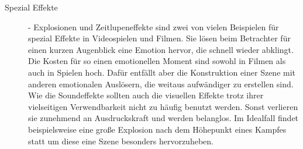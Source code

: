 \begin{description}
%
%
%
%
%
\item[Spezial Effekte] - Explosionen und Zeitlupeneffekte sind zwei von vielen Beispielen für spezial Effekte in Videospielen und Filmen. Sie lösen beim Betrachter für einen kurzen Augenblick eine Emotion hervor, die schnell wieder abklingt. Die Kosten für so einen emotionellen Moment sind sowohl in Filmen als auch in Spielen hoch. Dafür entfällt aber die Konstruktion einer Szene mit anderen emotionalen Auslösern, die weitaus aufwändiger zu erstellen sind. Wie die Soundeffekte sollten auch die visuellen Effekte trotz ihrer vielseitigen Verwendbarkeit nicht zu häufig benutzt werden. Sonst verlieren sie zunehmend an Ausdruckskraft und werden belanglos. Im Idealfall findet beispielsweise eine große Explosion nach dem Höhepunkt eines Kampfes statt um diese eine Szene besonders hervorzuheben. \cite[S. 25]{Adams:1515529}


\end{description}
